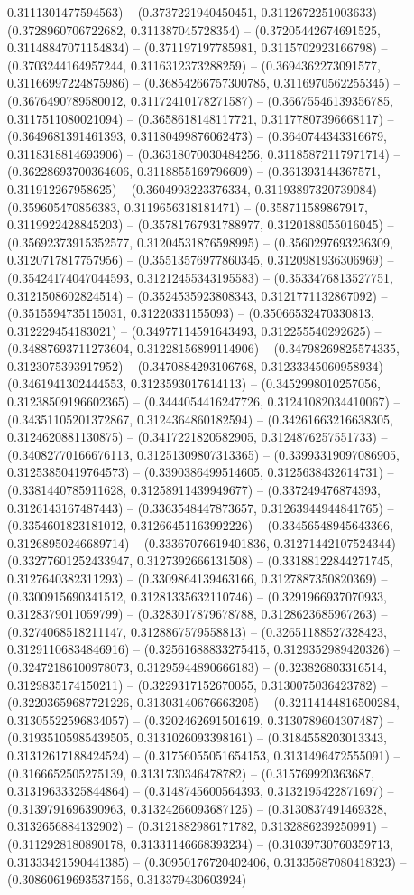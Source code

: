 0.3111301477594563) -- (0.3737221940450451, 0.3112672251003633) -- (0.3728960706722682, 0.311387045728354) -- (0.37205442674691525, 0.31148847071154834) -- (0.371197197785981, 0.3115702923166798) -- (0.3703244164957244, 0.3116312373288259) -- (0.3694362273091577, 0.31166997224875986) -- (0.36854266757300785, 0.3116970562255345) -- (0.3676490789580012, 0.31172410178271587) -- (0.36675546139356785, 0.3117511080021094) -- (0.3658618148117721, 0.31177807396668117) -- (0.3649681391461393, 0.31180499876062473) -- (0.3640744343316679, 0.3118318814693906) -- (0.36318070030484256, 0.31185872117971714) -- (0.36228693700364606, 0.3118855169796609) -- (0.361393144367571, 0.311912267958625) -- (0.3604993223376334, 0.31193897320739084) -- (0.359605470856383, 0.3119656318181471) -- (0.358711589867917, 0.3119922428845203) -- (0.35781767931788977, 0.3120188055016045) -- (0.35692373915352577, 0.31204531876598995) -- (0.3560297693236309, 0.3120717817757956) -- (0.35513576977860345, 0.3120981936306969) -- (0.35424174047044593, 0.31212455343195583) -- (0.3533476813527751, 0.3121508602824514) -- (0.3524535923808343, 0.3121771132867092) -- (0.3515594735115031, 0.31220331155093) -- (0.35066532470330813, 0.312229454183021) -- (0.34977114591643493, 0.312255540292625) -- (0.34887693711273604, 0.31228156899114906) -- (0.34798269825574335, 0.3123075393917952) -- (0.3470884293106768, 0.31233345060958934) -- (0.3461941302444553, 0.3123593017614113) -- (0.3452998010257056, 0.31238509196602365) -- (0.3444054416247726, 0.31241082034410067) -- (0.34351105201372867, 0.3124364860182594) -- (0.34261663216638305, 0.3124620881130875) -- (0.3417221820582905, 0.3124876257551733) -- (0.34082770166676113, 0.31251309807313365) -- (0.33993319097086905, 0.31253850419764573) -- (0.3390386499514605, 0.3125638432614731) -- (0.3381440785911628, 0.31258911439949677) -- (0.337249476874393, 0.3126143167487443) -- (0.3363548447873657, 0.31263944944841765) -- (0.3354601823181012, 0.31266451163992226) -- (0.33456548945643366, 0.31268950246689714) -- (0.33367076619401836, 0.31271442107524344) -- (0.33277601252433947, 0.3127392666131508) -- (0.33188122844271745, 0.3127640382311293) -- (0.3309864139463166, 0.3127887350820369) -- (0.3300915690341512, 0.31281335632110746) -- (0.3291966937070933, 0.3128379011059799) -- (0.3283017879678788, 0.3128623685967263) -- (0.3274068518211147, 0.3128867579558813) -- (0.32651188527328423, 0.31291106834846916) -- (0.32561688833275415, 0.3129352989420326) -- (0.32472186100978073, 0.31295944890666183) -- (0.323826803316514, 0.3129835174150211) -- (0.3229317152670055, 0.3130075036423782) -- (0.32203659687721226, 0.31303140676663205) -- (0.32114144816500284, 0.31305522596834057) -- (0.3202462691501619, 0.3130789604307487) -- (0.31935105985439505, 0.3131026093398161) -- (0.3184558203013343, 0.31312617188424524) -- (0.31756055051654153, 0.3131496472555091) -- (0.3166652505275139, 0.3131730346478782) -- (0.315769920363687, 0.31319633325844864) -- (0.3148745600564393, 0.3132195422871697) -- (0.3139791696390963, 0.31324266093687125) -- (0.3130837491469328, 0.3132656884132902) -- (0.3121882986171782, 0.3132886239250991) -- (0.3112928180890178, 0.31331146668393234) -- (0.31039730760359713, 0.31333421590441385) -- (0.30950176720402406, 0.31335687080418323) -- (0.30860619693537156, 0.313379430603924) -- 